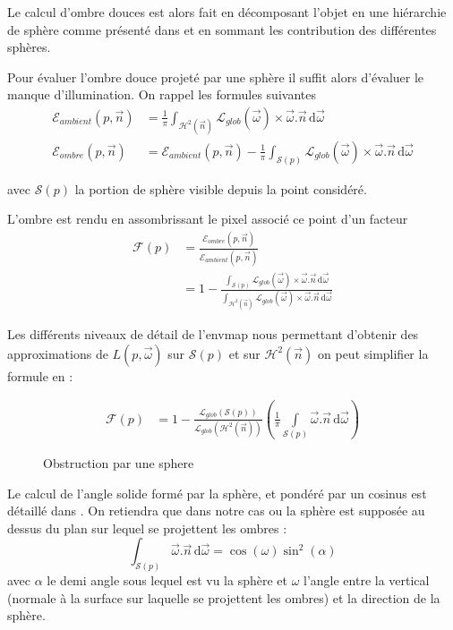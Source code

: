 \documentclass[10pt,a4paper,twoside, twocolumn]{report}
\newcommand*{\rootPath}{../}
\begin{document}
Le calcul d'ombre douces est alors fait en décomposant l'objet en une hiérarchie de sphère comme présenté dans\cite{Iwanicki} et en sommant les contribution des différentes sphères.

Pour évaluer l'ombre douce projeté par une sphère il suffit alors d'évaluer le manque d'illumination.
On rappel les formules suivantes
\begin{align*}
	\mathcal E_{ambient}(p, \vec n)	&=	\frac{1}{\pi}\int_{\mathcal{H}^2(\vec{n})}\mathcal L_{glob}(\vec\omega)\times\vec\omega.\vec n\, \mathrm d\vec\omega \\
	\mathcal E_{ombre}(p, \vec n)		&=	\mathcal E_{ambient}(p, \vec n) - \frac{1}{\pi}\int_{\mathcal{S}(p)}\mathcal L_{glob}(\vec\omega)\times\vec\omega.\vec n\, \mathrm d\vec\omega
\end{align*}

avec $\mathcal S(p)$ la portion de sphère visible depuis la point considéré.

L'ombre est rendu en assombrissant le pixel associé ce point d'un facteur
\begin{align}
	\mathcal F(p)	&=	\frac{\mathcal E_{ombre}(p, \vec n)}{\mathcal E_{ambient}(p, \vec n)}	\\
								&=	1 - \frac{\int_{\mathcal{S}(p)}\mathcal L_{glob}(\vec\omega)\times\vec\omega.\vec n\, \mathrm d\vec\omega}{\int_{\mathcal{H}^2(\vec{n})}\mathcal L_{glob}(\vec\omega)\times\vec\omega.\vec n\, \mathrm d\vec\omega}	
\end{align}


Les différents niveaux de détail de l'envmap nous permettant d'obtenir des approximations de $L(p,\vec\omega)$ sur $\mathcal S(p)$ et sur $\mathcal{H}^2(\vec{n})$ on peut simplifier la formule en :

\begin{align}
	\mathcal F(p)	&=	1 - \frac{\mathcal L_{glob}(\mathcal{S}(p))}{\mathcal L_{glob}(\mathcal{H}^2(\vec{n}))}\left(\frac{1}{\pi}\int\limits_{\mathcal{S}(p)}\vec\omega.\vec n\, \mathrm d\vec\omega\right)
\end{align}

\begin{figure}[!ht]
	\centering
	
	\caption{Obstruction par une sphere}
	\label{fig:tikz:obstruction}
\end{figure}

Le calcul de l'angle solide formé par la sphère, et pondéré par un cosinus est détaillé dans \cite{Snyder1996}. On retiendra que dans notre cas ou la sphère est supposée au dessus du plan sur lequel se projettent les ombres :
\begin{equation}
	\int_{\mathcal{S}(p)}\vec\omega.\vec n\, \mathrm d\vec\omega = \cos(\omega)\sin^2(\alpha)
\end{equation}
avec $\alpha$ le demi angle sous lequel est vu la sphère et $\omega$ l'angle entre la vertical (normale à la surface sur laquelle se projettent les ombres) et la direction de la sphère.
\end{document}
